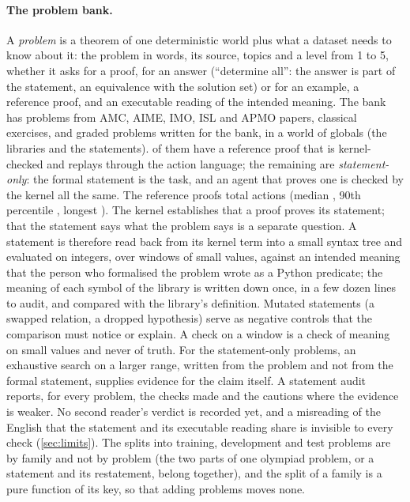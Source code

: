 \paragraph{The problem bank.}
A \emph{problem} is a theorem of one deterministic world plus what a dataset needs to know about it: the problem in words, its source, topics and a level from 1 to 5, whether it asks for a proof, for an answer (``determine all'': the answer is part of the statement, an equivalence with the solution set) or for an example, a reference proof, and an executable reading of the intended meaning.
The bank has \bankProblems{} problems from AMC, AIME, IMO, ISL and APMO papers, classical exercises, and graded problems written for the bank, in a world of \bankGlobals{} globals (the libraries and the statements).
\proofsProved{} of them have a reference proof that is kernel-checked and replays through the action language; the remaining \statementOnly{} are \emph{statement-only}: the formal statement is the task, and an agent that proves one is checked by the kernel all the same.
The reference proofs total \proofsTotalActions{} actions (median \proofsMedian, 90th percentile \proofsNinety, longest \proofsMax).
The kernel establishes that a proof proves its statement; that the statement says what the problem says is a separate question.
A statement is therefore read back from its kernel term into a small syntax tree and evaluated on integers, over windows of small values, against an intended meaning that the person who formalised the problem wrote as a Python predicate; the meaning of each symbol of the library is written down once, in a few dozen lines to audit, and compared with the library's definition.
Mutated statements (a swapped relation, a dropped hypothesis) serve as negative controls that the comparison must notice or explain.
A check on a window is a check of meaning on small values and never of truth.
For the statement-only problems, an exhaustive search on a larger range, written from the problem and not from the formal statement, supplies evidence for the claim itself.
A statement audit reports, for every problem, the checks made and the cautions where the evidence is weaker.
No second reader's verdict is recorded yet, and a misreading of the English that the statement and its executable reading share is invisible to every check (\cref{sec:limits}).
The splits into training, development and test problems are by family and not by problem (the two parts of one olympiad problem, or a statement and its restatement, belong together), and the split of a family is a pure function of its key, so that adding problems moves none.

